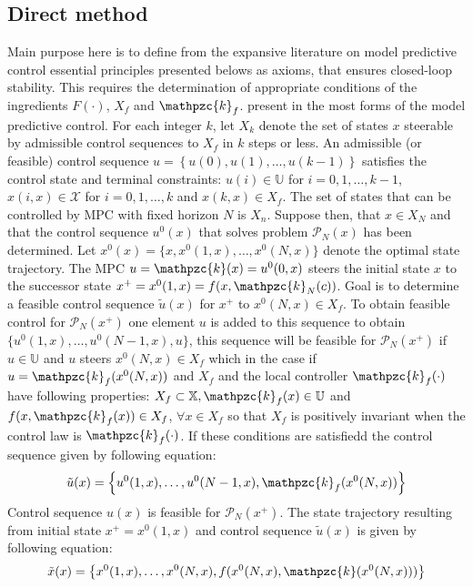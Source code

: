\subsection*{Direct method}
\noindent Main purpose here is to define from the expansive literature on model predictive control essential principles presented belows as axioms, that ensures closed-loop stability. This requires the determination of appropriate conditions of the ingredients $F(\cdot)$, $X_f$ and $\mathpzc{k}_f$. present in the most forms of the model predictive control. For each integer $k$, let $X_k$ denote  the set of states $x$ steerable by admissible control sequences to $X_f$ in $k$ steps or less. An admissible (or feasible) control sequence $u=\left\{u(0), u(1),\dots,u(k-1)\right\}$ satisfies the control state and terminal constraints: $u(i)\in\mathbb{U}$ for $i=0,1,\dots,k-1$, $x(i,x)\in\mathscr{X}$ for $i=0,1,\dots,k$ and $x(k,x)\in X_f$. The set of states that can be controlled by MPC with fixed horizon $N$ is $X_n$. Suppose then, that $x\in X_N$ and that the control sequence $u^0(x)$ that solves problem $\mathscr{P}_N(x)$ has been determined. Let $x^0(x)=\{x,x^0(1,x),\dots,x^0(N,x)\}$ denote the optimal state trajectory. The MPC $u=\mathpzc{k}(x)=u^0(0,x)$ steers the initial state $x$ to the successor state $x^+=x^0(1,x)=f(x,\mathpzc{k}_N(c))$. Goal is to determine a feasible control sequence $\tilde{u}(x)$ for $x^+$ to $x^0(N,x)\in X_f$. To obtain feasible control for $\mathscr{P}_N(x^+)$ one element $u$ is added to this sequence to obtain $\{u^0(1,x),\dots,u^0(N-1,x),u\}$, this sequence will be feasible for $\mathscr{P}_N(x^+)$ if $u\in\mathbb{U}$ and $u$ steers $x^0(N,x)\in X_f$ which in the case if $u=\mathpzc{k}_f(x^0(N,x))$ and $X_f$ and the local controller $\mathpzc{k}_f(\cdot)$ have following properties: $X_f \subset \mathbb{X}, \mathpzc{k}_f(x)\in\mathbb{U}$ and $f(x,\mathpzc{k}_f(x))\in X_f$, $\forall x \in X_f$ so that $X_f$ is positively invariant when the control law is $\mathpzc{k}_f(\cdot)$. If these conditions are satisfiedd the control sequence given by following equation:
\begin{equation}
    \tilde{u}(x) = \left\{u^0(1,x),\dots,u^0(N-1,x),\mathpzc{k}_f(x^0(N,x))\right\}
\end{equation}
\noindent Control sequence $\hat{u}(x)$ is feasible for $\mathscr{P}_N(x^+)$. The state trajectory resulting from initial state $x^+=x^0(1,x)$ and control sequence $\tilde{u}(x)$ is given by following equation:
\begin{equation}
    \tilde{x}(x)= \left\{x^0(1,x),\dots,x^0(N,x),f(x^0(N,x),\mathpzc{k}(x^0(N,x)))\right\}
\end{equation}
